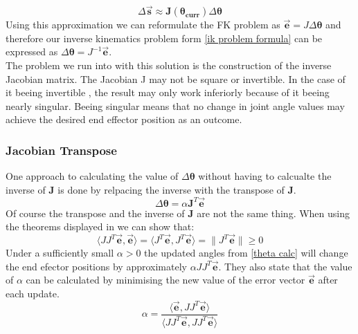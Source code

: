 \begin{equation}
\label{delta s approx}
\Delta\pmb{\vec{s}}\approx \pmb{J(\theta_{curr})}\Delta\pmb{\theta}
\end{equation}
Using this approximation  we can reformulate the FK problem as $\pmb{}\vec{\pmb{e}}=J\Delta\pmb{\theta}$ and therefore our inverse kinematics problem form \ref{ik problem formula} can be expressed as $ \Delta\pmb{\theta}=J^{-1}\vec{\pmb{e}}$. \\The problem we run into with this solution is the construction of the inverse Jacobian matrix. The Jacobian J may not be square or invertible. In the case of it beeing invertible , the result may only work inferiorly because of it beeing nearly singular. Beeing singular means that no change in joint angle values may achieve the desired end effector position as an outcome.
\subsubsection{Jacobian Transpose}
One approach to calculating the value of $\Delta\pmb{\theta}$ without having to calcualte the inverse of \textbf{J} is done by relpacing the inverse with the transpose of \textbf{J}.
\begin{equation}
\label{delta theta transpose}
\Delta\pmb{\theta}=\alpha \pmb{J}^{T}\vec{\pmb{e}}
\end{equation}
Of course the transpose and the inverse of \textbf{J} are not the same thing. When using the theorems displayed in \cite{DavidE.Orin.1984,Wolovich.1984} we can show that: 
\begin{equation}
\label{transpose show}
\langle JJ^{T}\vec{\pmb{e}},\vec{\pmb{e}}\rangle=\langle J^{T}\vec{\pmb{e}},J^{T}\vec{\pmb{e}}\rangle=\|J^{T}\vec{\pmb{e}}\|\geq 0
\end{equation}
Under a sufficiently small $\alpha>0$ the updated angles from \ref{theta calc} will change the end efector positions by approximately $\alpha JJ^{T}\vec{\pmb{e}}$. They also state that 
the value of $\alpha$ can be calculated by minimising the new value of the error vector $\vec{\pmb{e}}$ after each update.
\begin{equation}
\label{transpose alpha}
\alpha=\frac{\langle\vec{\pmb{e}},JJ^{T}\vec{\pmb{e}}\rangle}{\langle JJ^{T}\vec{\pmb{e}},JJ^{T}\vec{\pmb{e}}\rangle}
\end{equation}
